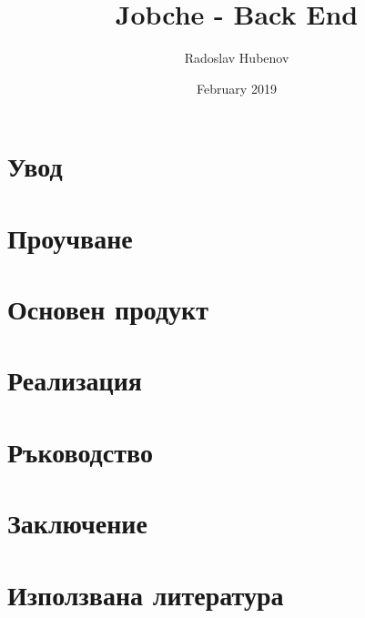 \documentclass[12pt, a4paper]{extreport}
\title{Jobche - Back End}
\author{Radoslav Hubenov}
\date{February 2019}
\begin{document}
\tableofcontents
\newpage
\chapter*{Увод}


\chapter{Проучване}


\chapter{Основен продукт}


\chapter{Реализация}


\chapter{Ръководство}


\chapter*{Заключение}


\chapter*{Използвана литература}
\printbibliography[heading=none]
\end{document}
